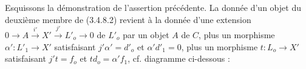Esquissons la démonstration de l'assertion précédente. La donnée d'un objet du deuxième membre de (3.4.8.2) revient à la donnée d'une extension $0 \longrightarrow A \stackrel{i'}{\longrightarrow} X' \stackrel{j'}{\longrightarrow} L'_o \longrightarrow 0$ de $L'_o$ par un objet $A$ de $C$, plus un morphisme $\alpha' : L'_1 \longrightarrow X'$ satisfaisant $j'\alpha' = d'_o$ et $\alpha'd'_1 = 0$, plus un morphisme $t : L_o \longrightarrow X'$ satisfaisant $j't = f_o$ et $td_o = \alpha'f_1$, cf. diagramme ci-dessous :

\begin{center}
\end{center}
